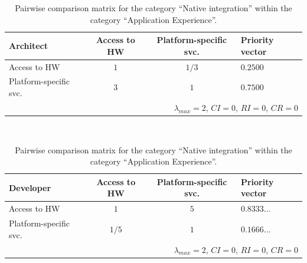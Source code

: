 \begin{table}[h!]
    \begin{center}
        \begin{tabular}{lccl}
            \hline
            \textbf{Architect}     & Access to HW & Platform-specific svc. & Priority vector \\
            \hline
            Access to HW           & $1$          & $1/3$                  & $0.2500$        \\
            Platform-specific svc. & $3$          & $1$                    & $0.7500$        \\
            \hline
            \multicolumn{4}{r}{$\lambda_{max} = 2$, $CI = 0$, $RI = 0$, $CR = 0$}            \\
            \hline
        \end{tabular}
        \\\vspace{1em}
        \begin{tabular}{lccl}
            \hline
            \textbf{Developer}     & Access to HW & Platform-specific svc. & Priority vector \\
            \hline
            Access to HW           & $1$          & $5$                    & $0.8333\ldots$  \\
            Platform-specific svc. & $1/5$        & $1$                    & $0.1666\ldots$  \\
            \hline
            \multicolumn{4}{r}{$\lambda_{max} = 2$, $CI = 0$, $RI = 0$, $CR = 0$}            \\
            \hline
        \end{tabular}
        \caption{Pairwise comparison matrix for the category ``Native integration'' within the category ``Application Experience''.}
        \label{tab:ni}
    \end{center}
\end{table}

